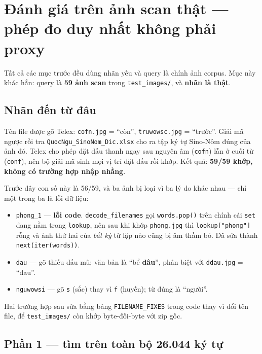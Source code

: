 \documentclass[11pt,a4paper]{article}
\newcommand{\code}[1]{\texttt{#1}}
\begin{document}
\section{Đánh giá trên ảnh scan thật --- phép đo duy nhất không phải proxy}
\label{sec:that}

Tất cả các mục trước đều dùng nhãn yếu và query là chính ảnh corpus. Mục này khác hẳn: query là
\textbf{59 ảnh scan} trong \code{test\_images/}, và \textbf{nhãn là thật}.

\subsection{Nhãn đến từ đâu}

Tên file được gõ Telex: \code{cofn.jpg} = ``còn'', \code{truwowsc.jpg} = ``trước''. Giải mã ngược
rồi tra \code{QuocNgu\_SinoNom\_Dic.xlsx} cho ra tập ký tự Sino-Nôm đúng của ảnh đó. Telex cho phép
đặt dấu thanh ngay sau nguyên âm (\code{cofn}) lẫn ở cuối từ (\code{conf}), nên bộ giải mã sinh mọi
vị trí đặt dấu rồi khớp. Kết quả: \textbf{59/59 khớp, không có trường hợp nhập nhằng}.

Trước đây con số này là 56/59, và ba ảnh bị loại vì ba lý do khác nhau --- chỉ một trong ba là lỗi
dữ liệu:

\begin{itemize}
  \item \code{phong\_1} --- \textbf{lỗi code}. \code{decode\_filenames} gọi \code{words.pop()} trên
        chính cái \code{set} đang nằm trong \code{lookup}, nên sau khi khớp \code{phong.jpg} thì
        \code{lookup["phong"]} rỗng và ảnh thứ hai của \emph{bất kỳ} từ lặp nào cũng bị âm thầm bỏ.
        Đã sửa thành \code{next(iter(words))}.
  \item \code{dau} --- gõ thiếu dấu mũ; văn bản là ``bể \textbf{dâu}'', phân biệt với
        \code{ddau.jpg} = ``đau''.
  \item \code{nguwowsi} --- gõ \code{s} (sắc) thay vì \code{f} (huyền); từ đúng là ``người''.
\end{itemize}

Hai trường hợp sau sửa bằng bảng \code{FILENAME\_FIXES} trong code thay vì đổi tên file, để
\code{test\_images/} còn khớp byte-đối-byte với zip gốc.

\subsection{Phần 1 --- tìm trên toàn bộ 26.044 ký tự}
\end{document}
